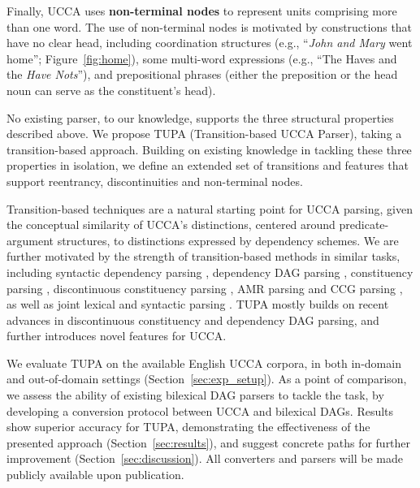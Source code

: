 \documentclass[11pt,a4paper]{article}
\newcommand{\parser}[1]{TUPA\textsubscript{#1}}
\newcommand{\secref}[1]{Section~\ref{#1}}
\newcommand{\figref}[1]{Figure~\ref{#1}}
\begin{document}
Finally, UCCA uses \textbf{non-terminal nodes}
to represent units comprising more than one word.
The use of non-terminal nodes is motivated by constructions that have no clear head, including
coordination structures (e.g., ``\textit{John and Mary} went home''; \figref{fig:home}),
some multi-word expressions (e.g., ``The Haves and the \textit{Have Nots}''),
and prepositional phrases (either the preposition or the head noun can serve as the constituent's head).

No existing parser, to our knowledge, supports the three structural properties described above.
We propose \parser{} (Transition-based UCCA Parser), taking a transition-based approach.
Building on existing knowledge in tackling these three properties
in isolation, we define an extended set of transitions and features
that support reentrancy, discontinuities and non-terminal nodes.

Transition-based techniques are a natural
starting point for UCCA parsing, given the conceptual similarity of UCCA's distinctions,
centered around predicate-argument structures, to distinctions expressed by dependency schemes.
We are further motivated by the strength of transition-based methods
in similar tasks, including syntactic dependency parsing
\cite{dyer2015transition,andor2016globally,kiperwasser2016simple},
dependency DAG parsing
\cite{sagae2008shift,ribeyre-villemontedelaclergerie-seddah:2014:SemEval,tokgoz2015transition},
constituency parsing \cite{sagae2005classifier,zhang2009transition,zhu2013fast},
discontinuous constituency parsing
\cite{maier2015discontinuous,maier-lichte:2016:DiscoNLP},
AMR parsing \cite{wang2015transition,wang-EtAl:2016:SemEval,dipendra2016neural,goodman2016noise}
and CCG parsing \cite{ambati2015incremental,ambati-deoskar-steedman:2016:N16-1},
as well as joint lexical and syntactic parsing
\cite{constant-nivre:2016:P16-1}.
\parser{} mostly builds on recent advances in discontinuous constituency
and dependency DAG parsing, and further introduces novel features for UCCA.

We evaluate \parser{} on the available English UCCA corpora, in both
in-domain and out-of-domain settings (\secref{sec:exp_setup}).
As a point of comparison, we assess the ability of existing bilexical DAG
parsers to tackle the task, by developing a conversion protocol
between UCCA and bilexical DAGs.
Results show superior accuracy for \parser{}, demonstrating the effectiveness of
the presented approach (\secref{sec:results}),
and suggest concrete paths for further improvement (\secref{sec:discussion}).
All converters and parsers will be made publicly available upon publication.
\end{document}
